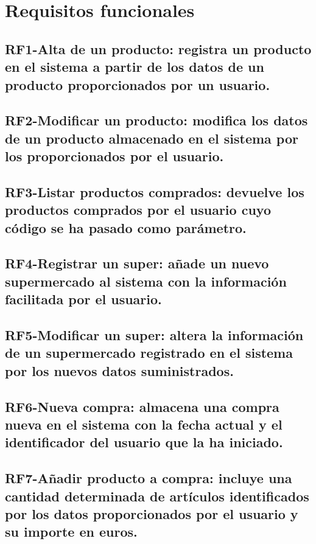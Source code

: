 \documentclass[a4paper,12pt]{report}
\begin{document}
\section{Requisitos funcionales}
\label{sec-2-2}
\subsection{\textbf{RF1-Alta de un producto}: registra un producto en el sistema a partir de los datos de un producto proporcionados por un usuario.}
\label{sec-2-2-1}

\subsection{\textbf{RF2-Modificar un producto}: modifica los datos de un producto almacenado en el sistema por los proporcionados por el usuario.}
\label{sec-2-2-2}

\subsection{\textbf{RF3-Listar productos comprados}: devuelve los productos comprados por el usuario cuyo código se ha pasado como parámetro.}
\label{sec-2-2-3}

\subsection{\textbf{RF4-Registrar un super}: añade un nuevo supermercado al sistema con la información facilitada por el usuario.}
\label{sec-2-2-4}

\subsection{\textbf{RF5-Modificar un super}: altera la información de un supermercado registrado en el sistema por los nuevos datos suministrados.}
\label{sec-2-2-5}

\subsection{\textbf{RF6-Nueva compra}: almacena una compra nueva en el sistema con la fecha actual y el identificador del usuario que la ha iniciado.}
\label{sec-2-2-6}

\subsection{\textbf{RF7-Añadir producto a compra}: incluye una cantidad determinada de artículos identificados por los datos proporcionados por el usuario y su importe en euros.}
\label{sec-2-2-7}
\end{document}
